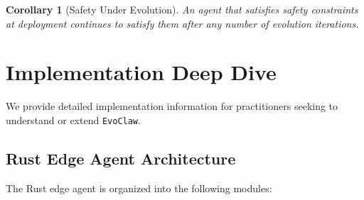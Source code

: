 \documentclass{article}
\newcommand{\evoclaw}{\texttt{EvoClaw}\xspace}
\newtheorem{corollary}[theorem]{Corollary}
\begin{document}
\begin{corollary}[Safety Under Evolution]
An agent that satisfies safety constraints at deployment continues to satisfy them after any number of evolution iterations.
\end{corollary}



\section{Implementation Deep Dive}
\label{sec:impl_deep}

We provide detailed implementation information for practitioners seeking to understand or extend \evoclaw{}.

\subsection{Rust Edge Agent Architecture}

The Rust edge agent is organized into the following modules:
\end{document}
